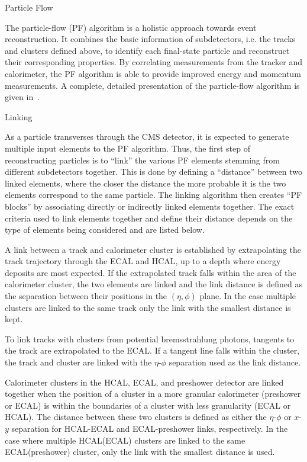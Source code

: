 \begin{section}{Particle Flow}

The particle-flow (PF) algorithm is a holistic approach towards event reconstruction.
It combines the basic information of subdetectors, i.e. the tracks and clusters defined above, to identify each final-state particle and reconstruct their corresponding properties.
By correlating measurements from the tracker and calorimeter, the PF algorithm is able to provide improved energy and momentum measurements. A complete, detailed presentation of the particle-flow algorithm is given in~\cite{1748-0221-12-10-P10003,CMS-PAS-PFT-09-001,CMS-PAS-PFT-10-001}.

\begin{subsection}{Linking}

As a particle transverses through the CMS detector, it is expected to generate multiple input elements to the PF algorithm.
Thus, the first step of reconstructing particles is to ``link'' the various PF elements stemming from different subdetectors together.
This is done by defining a ``distance'' between two linked elements, where the closer the distance the more probable it is the two elements correspond to the same particle.
The linking algorithm then creates ``PF blocks'' by associating directly or indirectly linked elements together.
The exact criteria used to link elements together and define their distance depends on the type of elements being considered and are listed below.

A link between a track and calorimeter cluster is established by extrapolating the track trajectory through the ECAL and HCAL, up to a depth where energy deposits are most expected.
If the extrapolated track falls within the area of the calorimeter cluster, the two elements are linked and the link distance is defined as the separation between their positions in the $(\eta,\phi)$ plane.
In the case multiple clusters are linked to the same track only the link with the smallest distance is kept.

To link tracks with clusters from potential bremsstrahlung photons, tangents to the track are extrapolated to the ECAL.
If a tangent line falls within the cluster, the track and cluster are linked with the $\eta$-$\phi$ separation used as the link distance.

Calorimeter clusters in the HCAL, ECAL, and preshower detector are linked together when the position of a cluster in a more granular calorimeter (preshower or ECAL) is within the boundaries of a cluster with less granularity (ECAL or HCAL).
The distance between these two clusters is defined as either the $\eta$-$\phi$ or $x$-$y$ separation for HCAL-ECAL and ECAL-preshower links, respectively.
In the case where multiple HCAL(ECAL) clusters are linked to the same ECAL(preshower) cluster, only the link with the smallest distance is used.


\end{subsection}
\end{section}
